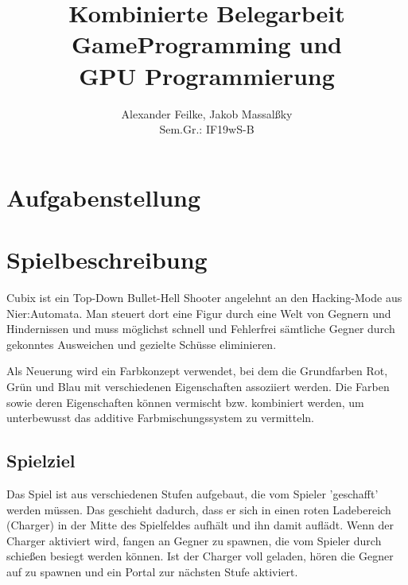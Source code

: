 \documentclass[a4paper,10pt,ngerman,fontsize=12pt]{scrreprt}
\title{Kombinierte Belegarbeit \\ GameProgramming und \\ GPU Programmierung}
\author{Alexander Feilke, Jakob Massal{\ss}ky \\ Sem.Gr.: IF19wS-B}
\begin{document}
\normalfont

\maketitle
\newpage %

\renewcommand{\contentsname}{Inhaltsverzeichnis}
\tableofcontents  %
\newpage


\sloppy
\flushbottom



\chapter{Aufgabenstellung}
\lipsum[3]





\chapter{Spielbeschreibung}
Cubix ist ein Top-Down Bullet-Hell Shooter angelehnt an den Hacking-Mode aus Nier:Automata\cite{qNierHM}.
Man steuert dort eine Figur durch eine Welt von Gegnern und Hindernissen und muss möglichst schnell und Fehlerfrei sämtliche Gegner durch gekonntes Ausweichen und gezielte Schüsse eliminieren.

Als Neuerung wird ein Farbkonzept verwendet, bei dem die Grundfarben Rot, Grün und Blau mit verschiedenen Eigenschaften assoziiert werden. Die Farben sowie deren Eigenschaften können vermischt bzw. kombiniert werden, um unterbewusst das additive Farbmischungssystem zu vermitteln.




\section{Spielziel}
Das Spiel ist aus verschiedenen Stufen aufgebaut, die vom Spieler 'geschafft' werden müssen.
Das geschieht dadurch, dass er sich in einen roten Ladebereich (Charger) in der Mitte des Spielfeldes aufhält und ihn damit auflädt.
Wenn der Charger aktiviert wird, fangen an Gegner zu spawnen, die vom Spieler durch schießen besiegt werden können.
Ist der Charger voll geladen, hören die Gegner auf zu spawnen und ein Portal zur nächsten Stufe aktiviert.
\end{document}
